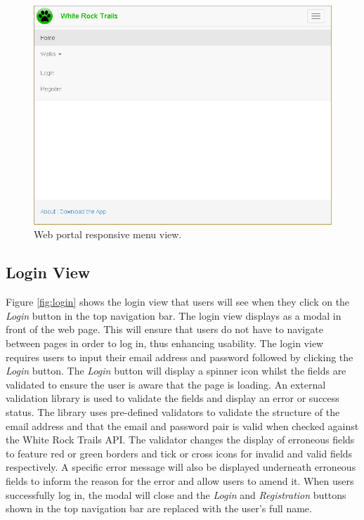 \documentclass[11pt,a4paper]{article}
\begin{document}
\begin{figure}[H]
\centering
\includegraphics[width=0.8\linewidth]{./img/webportal/home-responsive}
\caption{Web portal responsive menu view.}
\label{fig:home-responsive}
\end{figure}

\subsection{Login View}

Figure \ref{fig:login} shows the login view that users will see when they click on the \emph{Login} button in the top navigation bar. The login view displays as a modal in front of the web page. This will ensure that users do not have to navigate between pages in order to log in, thus enhancing usability. The login view requires users to input their email address and password followed by clicking the \emph{Login} button. The \emph{Login} button will display a spinner icon whilst the fields are validated to ensure the user is aware that the page is loading. An external validation library is used to validate the fields and display an error or success status. The library uses pre-defined validators to validate the structure of the email address and that the email and password pair is valid when checked against the White Rock Trails API. The validator changes the display of erroneous fields to feature red or green borders and tick or cross icons for invalid and valid fields respectively. A specific error message will also be displayed underneath erroneous fields to inform the reason for the error and allow users to amend it. When users successfully log in, the modal will close and the \emph{Login} and \emph{Registration} buttons shown in the top navigation bar are replaced with the user's full name.
\end{document}
